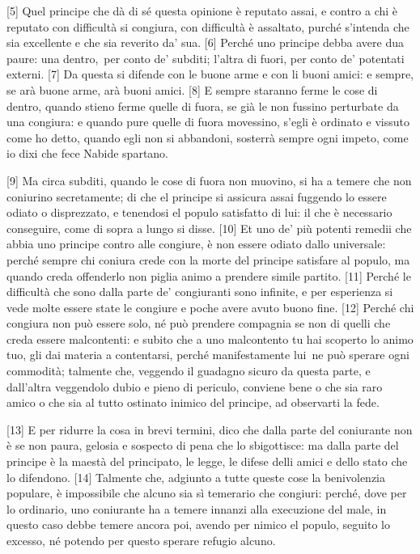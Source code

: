 {[}5{]} Quel principe che dà di sé questa opinione è reputato assai, e
contro a chi è reputato con difficultà si congiura, con difficultà è
assaltato, purché s'intenda che sia excellente e che sia reverito da'
sua. {[}6{]} Perché uno principe debba avere dua paure: una dentro,\est\ per
conto de' subditi; l'altra di fuori, per conto de' potentati externi.
{[}7{]} Da questa si difende con le buone arme e con li buoni amici: e
sempre, se arà buone arme, arà buoni amici. {[}8{]} E sempre staranno
ferme le cose di dentro, quando stieno ferme quelle di fuora, se già le
non fussino perturbate da una congiura: e quando pure quelle di fuora
movessino, s'egli è ordinato e vissuto come ho detto, quando egli non si
abbandoni, sosterrà sempre ogni impeto, come io dixi che fece Nabide
spartano.

{[}9{]} Ma circa subditi, quando le cose di fuora non muovino, si ha a
temere che non coniurino secretamente; di che el principe si assicura
assai fuggendo lo essere odiato o disprezzato, e tenendosi el populo
satisfatto di lui: il che è necessario conseguire, come di sopra a lungo
si disse. {[}10{]} Et uno de' più potenti remedii che abbia uno principe
contro alle congiure, è non essere odiato dallo universale: perché
sempre chi coniura crede con la morte del principe satisfare al populo,
ma quando creda offenderlo non piglia animo a prendere simile partito.
{[}11{]} Perché le difficultà che sono dalla parte de' congiuranti sono
infinite, e per esperienza si vede molte essere state le congiure e
poche avere avuto buono fine. {[}12{]} Perché chi congiura non può
essere solo, né può prendere compagnia se non di quelli che creda essere
malcontenti: e subito che a uno malcontento tu hai scoperto lo animo
tuo, gli dai materia a contentarsi, perché manifestamente lui\est\ ne può
sperare ogni commodità; talmente che, veggendo il guadagno sicuro da
questa parte, e dall'altra veggendolo dubio e pieno di periculo,
conviene bene o che sia raro amico o che sia al tutto ostinato inimico
del principe, ad observarti la fede.

{[}13{]} E per ridurre la cosa in brevi termini, dico che dalla parte
del coniurante non è se non paura, gelosia e sospecto di pena che lo
sbigottisce: ma dalla parte del principe è la maestà del principato, le
legge, le difese delli amici e dello stato che lo difendono. {[}14{]}
Talmente che, adgiunto a tutte queste cose la benivolenzia populare, è
impossibile che alcuno sia sì temerario che congiuri: perché, dove per
lo ordinario, uno coniurante ha a temere innanzi alla execuzione del
male, in questo caso debbe temere ancora poi, avendo per nimico el
populo, seguito lo excesso, né potendo per questo sperare refugio
alcuno.

